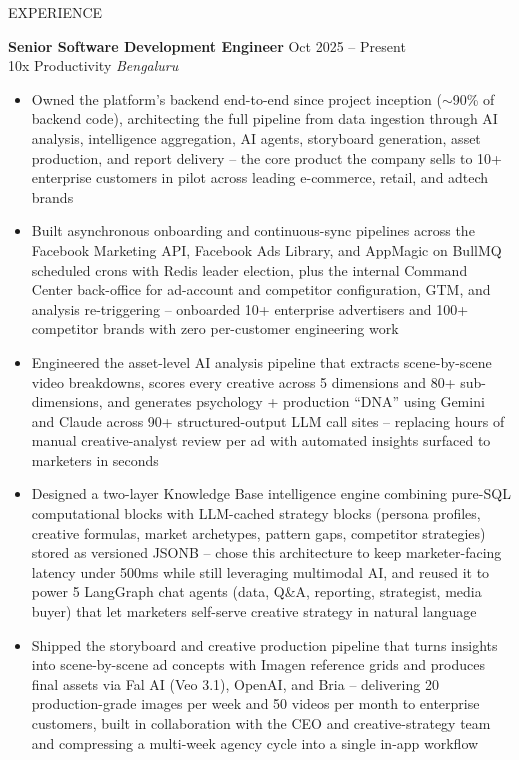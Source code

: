 \documentclass{resume}
\begin{document}
\begin{rSection}{EXPERIENCE}

\textbf{Senior Software Development Engineer} \hfill Oct 2025 -- Present \\
10x Productivity \hfill \textit{Bengaluru}
\begin{itemize}\itemsep -3pt
    \item Owned the platform's backend end-to-end since project inception ($\sim$90\% of backend code), architecting the full pipeline from data ingestion through AI analysis, intelligence aggregation, AI agents, storyboard generation, asset production, and report delivery -- the core product the company sells to 10+ enterprise customers in pilot across leading e-commerce, retail, and adtech brands
    \item Built asynchronous onboarding and continuous-sync pipelines across the Facebook Marketing API, Facebook Ads Library, and AppMagic on BullMQ scheduled crons with Redis leader election, plus the internal Command Center back-office for ad-account and competitor configuration, GTM, and analysis re-triggering -- onboarded 10+ enterprise advertisers and 100+ competitor brands with zero per-customer engineering work
    \item Engineered the asset-level AI analysis pipeline that extracts scene-by-scene video breakdowns, scores every creative across 5 dimensions and 80+ sub-dimensions, and generates psychology + production ``DNA'' using Gemini and Claude across 90+ structured-output LLM call sites -- replacing hours of manual creative-analyst review per ad with automated insights surfaced to marketers in seconds
    \item Designed a two-layer Knowledge Base intelligence engine combining pure-SQL computational blocks with LLM-cached strategy blocks (persona profiles, creative formulas, market archetypes, pattern gaps, competitor strategies) stored as versioned JSONB -- chose this architecture to keep marketer-facing latency under 500ms while still leveraging multimodal AI, and reused it to power 5 LangGraph chat agents (data, Q\&A, reporting, strategist, media buyer) that let marketers self-serve creative strategy in natural language
    \item Shipped the storyboard and creative production pipeline that turns insights into scene-by-scene ad concepts with Imagen reference grids and produces final assets via Fal AI (Veo 3.1), OpenAI, and Bria -- delivering 20 production-grade images per week and 50 videos per month to enterprise customers, built in collaboration with the CEO and creative-strategy team and compressing a multi-week agency cycle into a single in-app workflow

\end{itemize}
\end{rSection}
\end{document}
